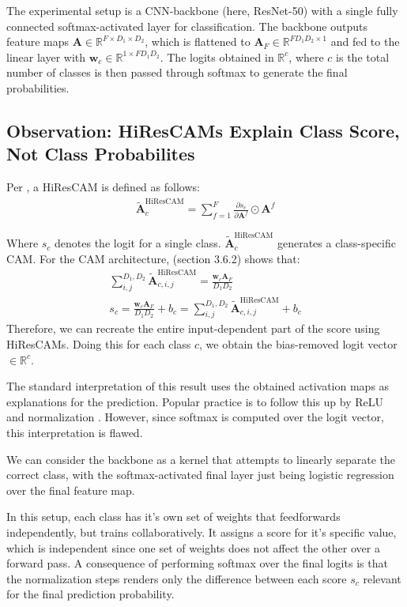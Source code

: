 \documentclass{article}
\theoremstyle{plain}
\theoremstyle{definition}
\theoremstyle{remark}
\begin{document}
The experimental setup is a CNN-backbone (here, ResNet-50) with a single fully connected softmax-activated layer for classification. The backbone outputs feature maps $\bm{A} \in \mathbb{R}^{F \times D_1 \times D_2}$, which is flattened to $\bm{A}_F \in \mathbb{R}^{FD_1D_2 \times 1}$ and fed to the linear layer with $\bm{w}_c \in \mathbb{R}^{1 \times FD_1D_2}$. The logits obtained in $\mathbb{R}^{c}$, where $c$ is the total number of classes is then passed through softmax to generate the final probabilities.

\subsection{Observation: HiResCAMs Explain Class Score, Not Class Probabilites}

Per \cite{draelos2020use}, a HiResCAM is defined as follows:
\begin{gather}
	\tilde{\mathcal{\bm{A}}}_c^{\text{HiResCAM}} = \sum^F_{f=1} \frac{\partial s_c}{\partial \bm{A}^f} \odot \bm{A}^f
\end{gather}

Where $s_c$ denotes the logit for a single class. $\tilde{\mathcal{\bm{A}}}_c^{\text{HiResCAM}}$ generates a class-specific CAM. For the CAM architecture, \cite{draelos2020use} (section 3.6.2) shows that:
\begin{gather}
	\sum^{D_1,D_2}_{i,j} \tilde{\mathcal{\bm{A}}}_{c,i,j}^{\text{HiResCAM}} = \frac{\bm{w}_c \bm{A}_F}{D_1 D_2} \\
	s_c = \frac{\bm{w}_c \bm{A}_F}{D_1 D_2} + b_c = \sum^{D_1,D_2}_{i,j} \tilde{\mathcal{\bm{A}}}_{c,i,j}^{\text{HiResCAM}} + b_c
\end{gather}
Therefore, we can recreate the entire input-dependent part of the score using HiResCAMs. Doing this for each class $c$, we obtain the bias-removed logit vector $\in \mathbb{R}^{c}$.

The standard interpretation of this result uses the obtained activation maps as explanations for the prediction. Popular practice is to follow this up by ReLU and normalization \citep{draelos2020use}. However, since softmax is computed over the logit vector, this interpretation is flawed.

We can consider the backbone as a kernel that attempts to linearly separate the correct class, with the softmax-activated final layer just being logistic regression over the final feature map.

In this setup, each class has it's own set of weights that feedforwards independently, but trains collaboratively. It assigns a score for it's specific value, which is independent since one set of weights does not affect the other over a forward pass. A consequence of performing softmax over the final logits is that the normalization steps renders only the difference between each score $s_c$ relevant for the final prediction probability.
\end{document}
